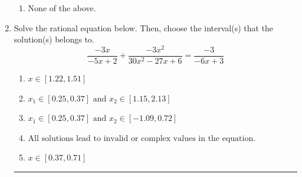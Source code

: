 \documentclass[14pt]{extbook}
\newcommand{\litem}[1]{\item#1\hspace*{-1cm}\rule{\textwidth}{0.4pt}}
\begin{document}
\begin{enumerate}
{\begin{enumerate}[label=\Alph*.]
\item None of the above.
\end{enumerate} }
\litem{
Solve the rational equation below. Then, choose the interval(s) that the solution(s) belongs to.\[ \frac{-3x}{-5x + 2} + \frac{-3x^{2}}{30x^{2} -27 x + 6} = \frac{-3}{-6x + 3} \]\begin{enumerate}[label=\Alph*.]
\item \( x \in [1.22,1.51] \)
\item \( x_1 \in [0.25, 0.37] \text{ and } x_2 \in [1.15,2.13] \)
\item \( x_1 \in [0.25, 0.37] \text{ and } x_2 \in [-1.09,0.72] \)
\item \( \text{All solutions lead to invalid or complex values in the equation.} \)
\item \( x \in [0.37,0.71] \)

\end{enumerate} }
\end{enumerate}
\end{document}
